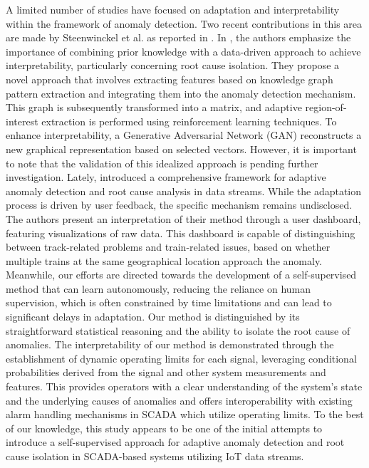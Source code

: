 A limited number of studies have focused on adaptation and interpretability within the framework of anomaly detection. Two recent contributions in this area are made by Steenwinckel et al. as reported in \citep{Steenwinckel2018, Steenwinckel2021}. In \citet{Steenwinckel2018}, the authors emphasize the importance of combining prior knowledge with a data-driven approach to achieve interpretability, particularly concerning root cause isolation. They propose a novel approach that involves extracting features based on knowledge graph pattern extraction and integrating them into the anomaly detection mechanism. This graph is subsequently transformed into a matrix, and adaptive region-of-interest extraction is performed using reinforcement learning techniques. To enhance interpretability, a Generative Adversarial Network (GAN) reconstructs a new graphical representation based on selected vectors. However, it is important to note that the validation of this idealized approach is pending further investigation. Lately, \citet{Steenwinckel2021} introduced a comprehensive framework for adaptive anomaly detection and root cause analysis in data streams. While the adaptation process is driven by user feedback, the specific mechanism remains undisclosed. The authors present an interpretation of their method through a user dashboard, featuring visualizations of raw data. This dashboard is capable of distinguishing between track-related problems and train-related issues, based on whether multiple trains at the same geographical location approach the anomaly. Meanwhile, our efforts are directed towards the development of a self-supervised method that can learn autonomously, reducing the reliance on human supervision, which is often constrained by time limitations and can lead to significant delays in adaptation. Our method is distinguished by its straightforward statistical reasoning and the ability to isolate the root cause of anomalies. The interpretability of our method is demonstrated through the establishment of dynamic operating limits for each signal, leveraging conditional probabilities derived from the signal and other system measurements and features. This provides operators with a clear understanding of the system's state and the underlying causes of anomalies and offers interoperability with existing alarm handling mechanisms in SCADA which utilize operating limits.
To the best of our knowledge, this study appears to be one of the initial attempts to introduce a self-supervised approach for adaptive anomaly detection and root cause isolation in SCADA-based systems utilizing IoT data streams.

